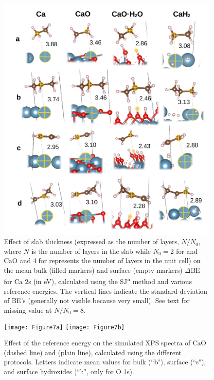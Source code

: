 \documentclass[%
aip,
amsmath,amssymb,
preprint,%
jcp,
showkeys,
]{revtex4-2}
\def\dbe{\ensuremath{\Delta\text{BE}}}
\begin{document}
\begin{figure}[p]
	\centering
	\includegraphics[width=\linewidth]{Figure6}
	\caption{Effect of slab thickness (expressed as the number of layers, $N/N_0$, where $N$ is the number of layers in the slab while $N_0 = 2$ for  and CaO and 4 for  represents the number of layers in the unit cell)  on the mean bulk (filled markers) and surface (empty markers) \dbe{} for Ca 2s (in \si{\electronvolt}), calculated using the SJ\textsuperscript{n} method and various reference energies. The vertical lines indicate the standard deviation of BE's (generally not visible because very small). See text for missing value at $N/N_0=8$.}
	\label{fig:slabsthicknessSJn}
\end{figure}


\begin{figure}[p]
	\centering
	\texttt{[image: Figure7a]}
	\texttt{[image: Figure7b]}
	\caption{Effect of the reference energy on the simulated XPS spectra of CaO (dashed line)  and  (plain line), calculated using the different protocols. Letters indicate mean values for bulk (``b"), surface (``s"), and surface hydroxides (``h", only for   O 1s).}
	\label{fig:slabOH2}
\end{figure}
\end{document}
